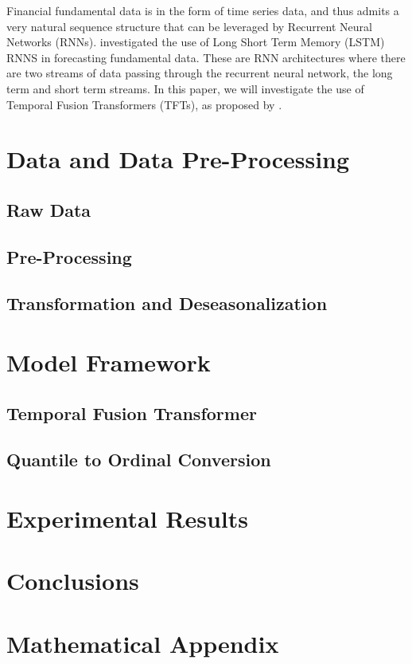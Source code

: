 \documentclass[AER]{AEA}
\begin{document}
Financial fundamental data is in the form of time series data, and thus admits a very natural sequence structure that can be leveraged by Recurrent Neural Networks (RNNs). \cite{euclidean} investigated the use of Long Short Term Memory (LSTM) RNNS in forecasting fundamental data. These are RNN architectures where there are two streams of data passing through the recurrent neural network, the long term and short term streams. In this paper, we will investigate the use of Temporal Fusion Transformers (TFTs), as proposed by \cite{tft}. 




\section{Data and Data Pre-Processing}
\subsection{Raw Data}
\subsection{Pre-Processing}
\subsection{Transformation and Deseasonalization}
\section{Model Framework}
\subsection{Temporal Fusion Transformer}
\subsection{Quantile to Ordinal Conversion}
\section{Experimental Results}
\section{Conclusions}




\appendix

\section{Mathematical Appendix}
\end{document}

